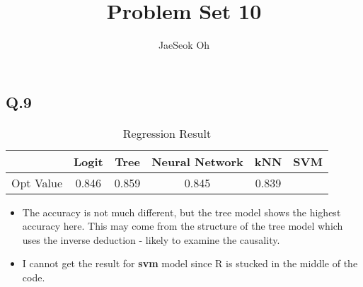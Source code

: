 \documentclass{article}
\title{Problem Set 10}
\author{JaeSeok Oh}
\begin{document}
	\begin{Large}
		\maketitle
		
		\section*{Q.9}
\begin{table}[h]
	\centering\caption{Regression Result}\centering
	\begin{tabular}[t]{lccccc}\toprule  
		& Logit & Tree & Neural Network & kNN & SVM \\\midrule
		Opt Value & 0.846 & 0.859 & 0.845 & 0.839 & \\
		\bottomrule
	\end{tabular}
	\label{t1:table1}
	\end{table}
	\begin{itemize}
		\item The accuracy is not much different, but the tree model shows the highest accuracy here. This may come from the structure of the tree model which uses the inverse deduction - likely to examine the causality.
		\item I cannot get the result for \textbf{svm} model since R is stucked in the middle of the code.
	\end{itemize}
		
	\end{Large}
\end{document}
